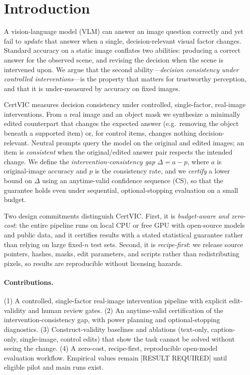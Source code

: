 \section{Introduction}

A vision-language model (VLM) can answer an image question correctly and yet
fail to \emph{update} that answer when a single, decision-relevant visual factor
changes. Standard accuracy on a static image conflates two abilities: producing a
correct answer for the observed scene, and revising the decision when the scene
is intervened upon. We argue that the second ability---\emph{decision consistency
under controlled interventions}---is the property that matters for trustworthy
perception, and that it is under-measured by accuracy on fixed images.

CertVIC measures decision consistency under controlled, single-factor,
real-image interventions. From a real image and an object mask we synthesize a
minimally edited counterpart that changes the expected answer (e.g.\ removing the
object beneath a supported item) or, for control items, changes nothing
decision-relevant. Neutral prompts query the model on the original and edited
images; an item is \emph{consistent} when the original/edited answer pair
respects the intended change. We define the
\emph{intervention-consistency gap} $\Delta = a - p$, where $a$ is original-image
accuracy and $p$ is the consistency rate, and we \emph{certify} a lower bound on
$\Delta$ using an anytime-valid confidence sequence (CS), so that the guarantee
holds even under sequential, optional-stopping evaluation on a small budget.

Two design commitments distinguish CertVIC. First, it is \emph{budget-aware and
zero-cost}: the entire pipeline runs on local CPU or free GPU with open-source
models and public data, and it certifies results with a stated statistical
guarantee rather than relying on large fixed-$n$ test sets. Second, it is
\emph{recipe-first}: we release source pointers, hashes, masks, edit
parameters, and scripts rather than redistributing pixels, so results are
reproducible without licensing hazards.

\paragraph{Contributions.}
(1) A controlled, single-factor real-image intervention pipeline with explicit
edit-validity and human review gates.
(2) An anytime-valid certification of the intervention-consistency gap, with
power planning and optional-stopping diagnostics.
(3) Construct-validity baselines and ablations (text-only, caption-only,
single-image, control edits) that show the task cannot be solved without seeing
the change.
(4) A zero-cost, recipe-first, reproducible open-model evaluation workflow.
Empirical values remain [RESULT REQUIRED] until eligible pilot and main runs
exist.
